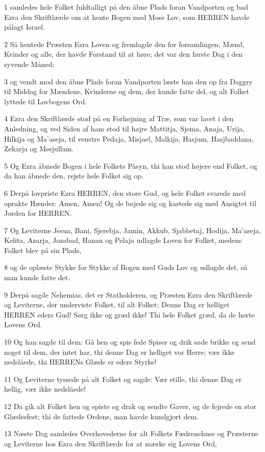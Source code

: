 \par 1 samledes hele Folket fuldtalligt på den åbne Plads foran Vandporten og bad Ezra den Skriftlærde om at hente Bogen med Mose Lov, som HERREN havde pålagt Israel.
\par 2 Så hentede Præsten Ezra Loven og fremlagde den for forsamlingen, Mænd, Kvinder og alle, der havde Forstand til at høre; det var den første Dag i den syvende Måned;
\par 3 og vendt mod den åbne Plads foran Vandporten læste han den op fra Daggry til Middag for Mændene, Kvinderne og dem, der kunde fatte del, og alt Folket lyttede til Lovbogens Ord.
\par 4 Ezra den Skriftlærde stod på en Forhøjning af Træ, som var lavet i den Anledning, og ved Siden af ham stod til højre Mattitja, Sjema, Anaja, Urija, Hilkija og Ma'aseja, til venstre Pedaja, Misjael, Malkija, Hasjum, Hasjbaddana, Zekarja og Mesjullam.
\par 5 Og Ezra åbnede Bogen i hele Folkets Påsyn, thi han stod højere end Folket, og da han åbnede den, rejste hele Folket sig op.
\par 6 Derpå lovpriste Ezra HERREN, den store Gud, og hele Folket svarede med oprakte Hænder: Amen, Amen! Og de bøjede sig og kastede sig med Ansigtet til Jorden for HERREN.
\par 7 Og Leviterne Jesua, Bani, Sjerebja, Jamin, Akkub, Sjabbetaj, Hodija, Ma'aseja, Kelita, Azarja, Jozabad, Hanan og Pelaja udlagde Loven for Folket, medens Folket blev på sin Plads,
\par 8 og de oplæste Stykke for Stykke af Bogen med Guds Lov og udlagde det, så man kunde fatte det.
\par 9 Derpå sagde Nehemias, det er Statholderen, og Præsten Ezra den Skriftlærde og Leviterne, der underviste Folket, til alt Folket: Denne Dag er helliget HERREN eders Gud! Sørg ikke og græd ikke! Thi hele Folket græd, da de hørte Lovens Ord.
\par 10 Og han sagde til dem: Gå hen og spis fede Spiser og drik søde brikke og send noget til dem, der intet har, thi denne Dag er helliget vor Herre; vær ikke nedslåede, thi HERRENs Glæde er eders Styrke!
\par 11 Og Leviterne tyssede på alt Folket og sagde: Vær stille, thi denne Dag er hellig, vær ikke nedslåede!
\par 12 Da gik alt Folket hen og spiste og drak og sendte Gaver, og de fejrede en stor Glædesfest; thi de fattede Ordene, man havde kundgjort dem.
\par 13 Næste Dag samledes Overhovederne for alt Folkets Fædrenehuse og Præsterne og Leviterne hos Ezra den Skriftlærde for at mærke sig Lovens Ord,
